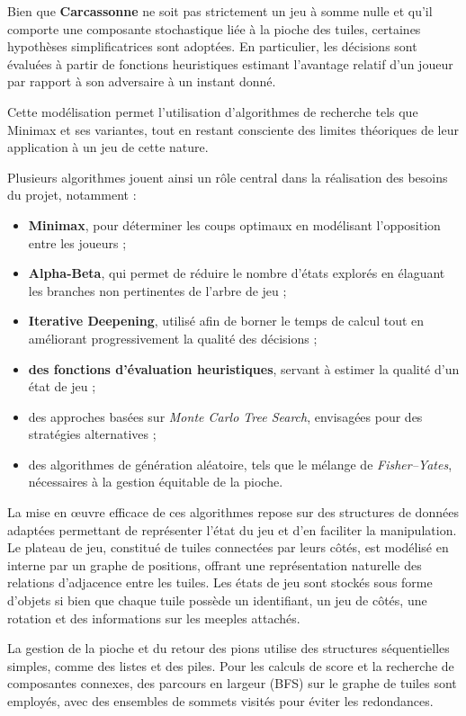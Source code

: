 \documentclass[11pt]{article}
\begin{document}
Bien que \textbf{Carcassonne} ne soit pas strictement un jeu à somme nulle et qu’il comporte une composante stochastique liée à la pioche des tuiles, certaines hypothèses simplificatrices sont adoptées.
En particulier, les décisions sont évaluées à partir de fonctions heuristiques estimant l’avantage relatif d’un joueur par rapport à son adversaire à un instant donné.

Cette modélisation permet l’utilisation d’algorithmes de recherche tels que Minimax et ses variantes, tout en restant consciente des limites théoriques de leur application à un jeu de cette nature.

Plusieurs algorithmes jouent ainsi un rôle central dans la réalisation des besoins du projet, notamment :
\begin{itemize}
  \item[-] \textbf{Minimax}\cite{minimax}, pour déterminer les coups optimaux en modélisant l’opposition entre les joueurs ;
  \item[-] \textbf{Alpha-Beta}\cite{alpha_beta}, qui permet de réduire le nombre d’états explorés en élaguant les branches non pertinentes de l’arbre de jeu ;
  \item[-] \textbf{Iterative Deepening}\cite{iterative_deepening}, utilisé afin de borner le temps de calcul tout en améliorant progressivement la qualité des décisions ;
  \item[-] \textbf{des fonctions d’évaluation heuristiques}, servant à estimer la qualité d’un état de jeu ;
  \item[-] des approches basées sur \textit{Monte Carlo Tree Search}\cite{monte_carlo}, envisagées pour des stratégies alternatives ;
  \item[-] des algorithmes de génération aléatoire, tels que le mélange de \textit{Fisher–Yates}\cite{fisher_yates}, nécessaires à la gestion équitable de la pioche.
\end{itemize}

La mise en œuvre efficace de ces algorithmes repose sur des structures de données adaptées permettant de représenter l’état du jeu et d’en faciliter la manipulation. 
Le plateau de jeu, constitué de tuiles connectées par leurs côtés, est modélisé en interne par un graphe de positions, offrant une représentation naturelle des relations d’adjacence entre les tuiles. 
Les états de jeu sont stockés sous forme d’objets si bien que chaque tuile possède un identifiant, un jeu de côtés, une rotation et des informations sur les meeples attachés.

La gestion de la pioche et du retour des pions utilise des structures séquentielles simples, comme des listes et des piles. Pour les calculs de score et la recherche de composantes connexes, des parcours en largeur (BFS) sur le graphe de tuiles sont employés, avec des ensembles de sommets visités pour éviter les redondances.
\end{document}
